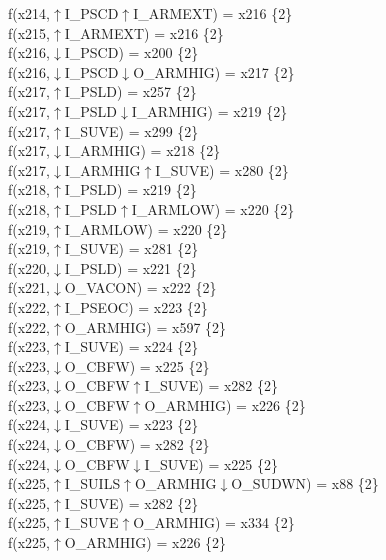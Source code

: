 f(x214,$\uparrow$I\_PSCD$\uparrow$I\_ARMEXT) = x216 \{2\} \\  
f(x215,$\uparrow$I\_ARMEXT) = x216 \{2\} \\  
f(x216,$\downarrow$I\_PSCD) = x200 \{2\} \\  
f(x216,$\downarrow$I\_PSCD$\downarrow$O\_ARMHIG) = x217 \{2\} \\  
f(x217,$\uparrow$I\_PSLD) = x257 \{2\} \\  
f(x217,$\uparrow$I\_PSLD$\downarrow$I\_ARMHIG) = x219 \{2\} \\  
f(x217,$\uparrow$I\_SUVE) = x299 \{2\} \\  
f(x217,$\downarrow$I\_ARMHIG) = x218 \{2\} \\  
f(x217,$\downarrow$I\_ARMHIG$\uparrow$I\_SUVE) = x280 \{2\} \\  
f(x218,$\uparrow$I\_PSLD) = x219 \{2\} \\  
f(x218,$\uparrow$I\_PSLD$\uparrow$I\_ARMLOW) = x220 \{2\} \\  
f(x219,$\uparrow$I\_ARMLOW) = x220 \{2\} \\  
f(x219,$\uparrow$I\_SUVE) = x281 \{2\} \\  
f(x220,$\downarrow$I\_PSLD) = x221 \{2\} \\  
f(x221,$\downarrow$O\_VACON) = x222 \{2\} \\  
f(x222,$\uparrow$I\_PSEOC) = x223 \{2\} \\  
f(x222,$\uparrow$O\_ARMHIG) = x597 \{2\} \\  
f(x223,$\uparrow$I\_SUVE) = x224 \{2\} \\  
f(x223,$\downarrow$O\_CBFW) = x225 \{2\} \\  
f(x223,$\downarrow$O\_CBFW$\uparrow$I\_SUVE) = x282 \{2\} \\  
f(x223,$\downarrow$O\_CBFW$\uparrow$O\_ARMHIG) = x226 \{2\} \\  
f(x224,$\downarrow$I\_SUVE) = x223 \{2\} \\  
f(x224,$\downarrow$O\_CBFW) = x282 \{2\} \\  
f(x224,$\downarrow$O\_CBFW$\downarrow$I\_SUVE) = x225 \{2\} \\  
f(x225,$\uparrow$I\_SUILS$\uparrow$O\_ARMHIG$\downarrow$O\_SUDWN) = x88 \{2\} \\  
f(x225,$\uparrow$I\_SUVE) = x282 \{2\} \\  
f(x225,$\uparrow$I\_SUVE$\uparrow$O\_ARMHIG) = x334 \{2\} \\  
f(x225,$\uparrow$O\_ARMHIG) = x226 \{2\} \\  
